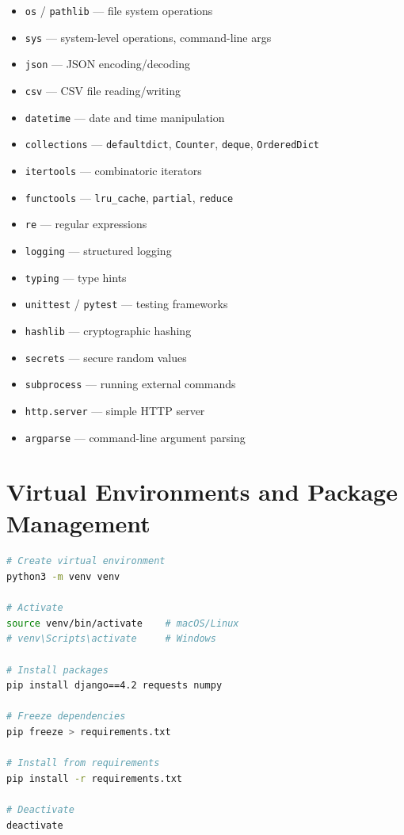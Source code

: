 \documentclass[12pt, a4paper, oneside]{book}
\begin{document}
\begin{itemize}[leftmargin=2em]
    \item \texttt{os} / \texttt{pathlib} --- file system operations
    \item \texttt{sys} --- system-level operations, command-line args
    \item \texttt{json} --- JSON encoding/decoding
    \item \texttt{csv} --- CSV file reading/writing
    \item \texttt{datetime} --- date and time manipulation
    \item \texttt{collections} --- \texttt{defaultdict}, \texttt{Counter}, \texttt{deque}, \texttt{OrderedDict}
    \item \texttt{itertools} --- combinatoric iterators
    \item \texttt{functools} --- \texttt{lru\_cache}, \texttt{partial}, \texttt{reduce}
    \item \texttt{re} --- regular expressions
    \item \texttt{logging} --- structured logging
    \item \texttt{typing} --- type hints
    \item \texttt{unittest} / \texttt{pytest} --- testing frameworks
    \item \texttt{hashlib} --- cryptographic hashing
    \item \texttt{secrets} --- secure random values
    \item \texttt{subprocess} --- running external commands
    \item \texttt{http.server} --- simple HTTP server
    \item \texttt{argparse} --- command-line argument parsing
\end{itemize}

\section{Virtual Environments and Package Management}

\begin{lstlisting}[language=bash, caption={Virtual environment workflow}]
# Create virtual environment
python3 -m venv venv

# Activate
source venv/bin/activate    # macOS/Linux
# venv\Scripts\activate     # Windows

# Install packages
pip install django==4.2 requests numpy

# Freeze dependencies
pip freeze > requirements.txt

# Install from requirements
pip install -r requirements.txt

# Deactivate
deactivate
\end{lstlisting}
\end{document}

